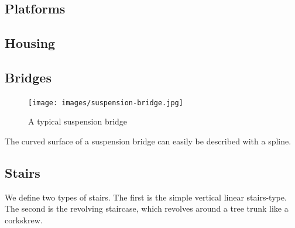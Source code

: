  
\subsection{Platforms}
\label{sec:platform}
 


\subsection{Housing}
\label{sec:building}




\subsection{Bridges}
\label{sec:bridges}





\begin{figure}[ht]
\centering
\texttt{[image: images/suspension-bridge.jpg]}
\label{fig:bridgeExample}
\caption{A typical suspension bridge}
\end{figure}
The curved surface of a suspension bridge can easily be described with a spline.   

\subsection{Stairs}
\label{sec:stairs}
  
We define two types of stairs. The first is the simple vertical linear stairs-type. The second is the revolving staircase, which revolves around a tree trunk like a corkskrew. 


%

  
